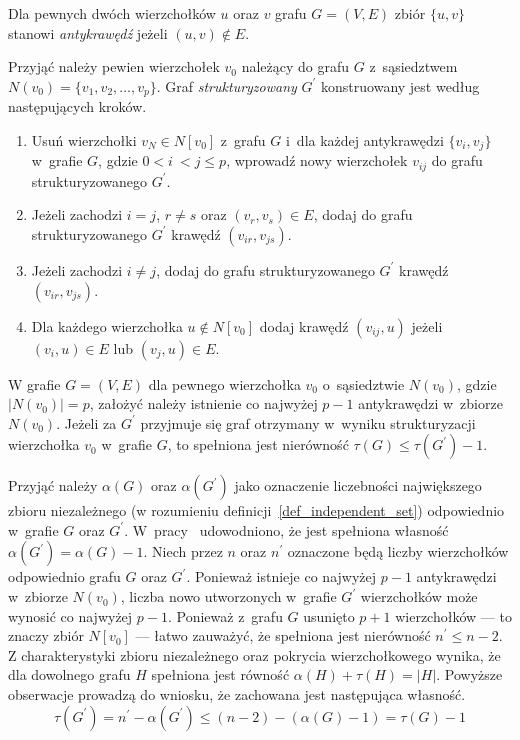 \par{
  \begin{definition}
    Dla pewnych dwóch wierzchołków $u$ oraz $v$ grafu $G=(V, E)$ zbiór $\{u, v\}$ stanowi \emph{antykrawędź} jeżeli $(u, v) \notin E$.
  \end{definition}

  Przyjąć należy pewien wierzchołek $v_0$ należący do grafu $G$ z~sąsiedztwem $N(v_0)=\{v_1, v_2, \ldots, v_p\}$.
  Graf \emph{strukturyzowany} $G^\prime$ konstruowany jest według następujących kroków.
  \begin{enumerate}
    \item Usuń wierzchołki $v_N \in N[v_0]$ z~grafu $G$ i~dla każdej antykrawędzi $\{v_i, v_j\}$ w~grafie $G$, gdzie $0 < i~< j \leq p$, wprowadź nowy wierzchołek $v_{ij}$ do grafu strukturyzowanego $G^\prime$.
    \item Jeżeli zachodzi $i=j$, $r\neq s$ oraz $(v_r, v_s) \in E$, dodaj do grafu strukturyzowanego $G^\prime$ krawędź $(v_{ir}, v_{js})$.
    \item Jeżeli zachodzi $i \neq j$, dodaj do grafu strukturyzowanego $G^\prime$ krawędź $(v_{ir}, v_{js})$.
    \item Dla każdego wierzchołka $u \notin N[v_0]$ dodaj krawędź $(v_{ij}, u)$ jeżeli $(v_i, u) \in E$ lub $(v_j, u) \in E$.
  \end{enumerate}
  \begin{theorem}
    W grafie $G=(V, E)$ dla pewnego wierzchołka $v_0$ o~sąsiedztwie $N(v_0)$, gdzie $|N(v_0)|=p$, założyć należy istnienie co najwyżej $p-1$ antykrawędzi w~zbiorze $N(v_0)$.
    Jeżeli za $G^\prime$ przyjmuje się graf otrzymany w~wyniku strukturyzacji wierzchołka $v_0$ w~grafie $G$, to spełniona jest nierówność $\tau(G) \leq \tau(G^\prime) - 1$.
  \end{theorem}
  \begin{bproof}
    Przyjąć należy $\alpha(G)$ oraz $\alpha(G^\prime)$ jako oznaczenie liczebności największego zbioru niezależnego (w rozumieniu definicji~\ref{def_independent_set}) odpowiednio w~grafie $G$ oraz $G^\prime$.
    W~pracy~\cite{Ebengger:1984} udowodniono, że jest spełniona własność $\alpha(G^\prime)=\alpha(G) - 1$.
    Niech przez $n$ oraz $n^\prime$ oznaczone będą liczby wierzchołków odpowiednio grafu $G$ oraz $G^\prime$.
    Ponieważ istnieje co najwyżej $p - 1$ antykrawędzi w~zbiorze $N(v_0)$, liczba nowo utworzonych w~grafie $G^\prime$ wierzchołków może wynosić co najwyżej $p - 1$.
    Ponieważ z~grafu $G$ usunięto $p+1$ wierzchołków --- to znaczy zbiór $N[v_0]$ --- łatwo zauważyć, że spełniona jest nierówność $n^\prime \leq n-2$.
    Z charakterystyki zbioru niezależnego oraz pokrycia wierzchołkowego wynika, że dla dowolnego grafu $H$ spełniona jest równość $\alpha(H)+\tau(H)=|H|$.
    Powyższe obserwacje prowadzą do wniosku, że zachowana jest następująca własność.
    \[\tau(G^\prime)=n^\prime-\alpha(G^\prime)\leq (n-2)-(\alpha(G)-1)=\tau(G)-1\]
  \end{bproof}
}
